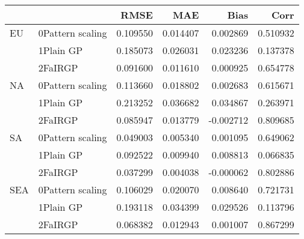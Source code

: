 \begin{tabular}{llrrrr}
\toprule
    &         &      RMSE &       MAE &      Bias &      Corr \\
\midrule
EU & 0Pattern scaling &  0.109550 &  0.014407 &  0.002869 &  0.510932 \\
    & 1Plain GP &  0.185073 &  0.026031 &  0.023236 &  0.137378 \\
    & 2FaIRGP &  0.091600 &  0.011610 &  0.000925 &  0.654778 \\
NA & 0Pattern scaling &  0.113660 &  0.018802 &  0.002683 &  0.615671 \\
    & 1Plain GP &  0.213252 &  0.036682 &  0.034867 &  0.263971 \\
    & 2FaIRGP &  0.085947 &  0.013779 & -0.002712 &  0.809685 \\
SA & 0Pattern scaling &  0.049003 &  0.005340 &  0.001095 &  0.649062 \\
    & 1Plain GP &  0.092522 &  0.009940 &  0.008813 &  0.066835 \\
    & 2FaIRGP &  0.037299 &  0.004038 & -0.000062 &  0.802886 \\
SEA & 0Pattern scaling &  0.106029 &  0.020070 &  0.008640 &  0.721731 \\
    & 1Plain GP &  0.193118 &  0.034399 &  0.029526 &  0.113796 \\
    & 2FaIRGP &  0.068382 &  0.012943 &  0.001007 &  0.867299 \\
\bottomrule
\end{tabular}
